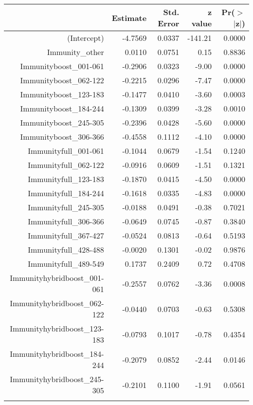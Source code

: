 \begin{table}[ht]
\centering
\begin{tabular}{rrrrr}
  \hline
 & Estimate & Std. Error & z value & Pr($>$$|$z$|$) \\ 
  \hline
(Intercept) & -4.7569 & 0.0337 & -141.21 & 0.0000 \\ 
  Immunity\_other & 0.0110 & 0.0751 & 0.15 & 0.8836 \\ 
  Immunityboost\_001-061 & -0.2906 & 0.0323 & -9.00 & 0.0000 \\ 
  Immunityboost\_062-122 & -0.2215 & 0.0296 & -7.47 & 0.0000 \\ 
  Immunityboost\_123-183 & -0.1477 & 0.0410 & -3.60 & 0.0003 \\ 
  Immunityboost\_184-244 & -0.1309 & 0.0399 & -3.28 & 0.0010 \\ 
  Immunityboost\_245-305 & -0.2396 & 0.0428 & -5.60 & 0.0000 \\ 
  Immunityboost\_306-366 & -0.4558 & 0.1112 & -4.10 & 0.0000 \\ 
  Immunityfull\_001-061 & -0.1044 & 0.0679 & -1.54 & 0.1240 \\ 
  Immunityfull\_062-122 & -0.0916 & 0.0609 & -1.51 & 0.1321 \\ 
  Immunityfull\_123-183 & -0.1870 & 0.0415 & -4.50 & 0.0000 \\ 
  Immunityfull\_184-244 & -0.1618 & 0.0335 & -4.83 & 0.0000 \\ 
  Immunityfull\_245-305 & -0.0188 & 0.0491 & -0.38 & 0.7021 \\ 
  Immunityfull\_306-366 & -0.0649 & 0.0745 & -0.87 & 0.3840 \\ 
  Immunityfull\_367-427 & -0.0524 & 0.0813 & -0.64 & 0.5193 \\ 
  Immunityfull\_428-488 & -0.0020 & 0.1301 & -0.02 & 0.9876 \\ 
  Immunityfull\_489-549 & 0.1737 & 0.2409 & 0.72 & 0.4708 \\ 
  Immunityhybridboost\_001-061 & -0.2557 & 0.0762 & -3.36 & 0.0008 \\ 
  Immunityhybridboost\_062-122 & -0.0440 & 0.0703 & -0.63 & 0.5308 \\ 
  Immunityhybridboost\_123-183 & -0.0793 & 0.1017 & -0.78 & 0.4354 \\ 
  Immunityhybridboost\_184-244 & -0.2079 & 0.0852 & -2.44 & 0.0146 \\ 
  Immunityhybridboost\_245-305 & -0.2101 & 0.1100 & -1.91 & 0.0561 \\ 
$$
\end{tabular}
\end{table}
